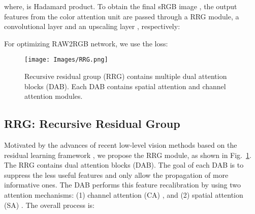 \documentclass[10pt,twocolumn,letterpaper]{article}
\begin{document}
where,  is Hadamard product. 
To obtain the final sRGB image , the output features  from the color attention unit are passed through a RRG module, a convolutional layer  and an upscaling layer  \cite{Shi2016}, respectively:

For optimizing RAW2RGB network, we use the  loss:



\begin{figure}[t!]
\begin{center}
 \texttt{[image: Images/RRG.png]}  
\end{center}\vspace{-1.4em}
    \caption{Recursive residual group (RRG) contains multiple dual attention blocks (DAB). Each DAB contains spatial attention and channel attention modules.}\vspace{-0.5em}
    \label{Fig:rrg}
\vspace{-2mm}
\end{figure}

\subsection{RRG: Recursive Residual Group}
\label{sec:rrg}
Motivated by the advances of recent low-level vision methods \cite{ren2019rain,Zhang2018dehaze,DnCNN,zhang2018rcan} based on the residual learning framework \cite{He2016},
we propose the RRG module, as shown in Fig.~\ref{Fig:rrg}. 
The RRG contains  dual attention blocks (DAB). 
The goal of each DAB is to suppress the less useful features and only allow the propagation of more informative ones. 
The DAB performs this feature recalibration by using two  
attention mechanisms: (1) channel attention (CA) \cite{hu2018squeeze}, and (2) spatial attention (SA) \cite{woo2018cbam}.  
The overall process is:
\end{document}
